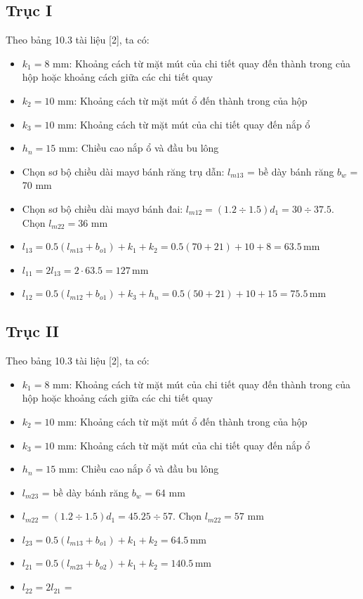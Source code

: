 \subsection{Trục I}
Theo bảng 10.3 tài liệu [2], ta có:
\begin{itemize}
    \item $k_1 = 8$ mm: Khoảng cách từ mặt mút của chi tiết quay đến thành trong của hộp hoặc khoảng cách giữa các chi tiết quay
    \item $k_2 = 10$ mm: Khoảng cách từ mặt mút ổ đến thành trong của hộp
    \item $k_3 = 10$ mm: Khoảng cách từ mặt mút của chi tiết quay đến nắp ổ
    \item $h_n = 15$ mm: Chiều cao nắp ổ và đầu bu lông
    \item Chọn sơ bộ chiều dài mayơ bánh răng trụ dẫn: $l_{m13}$ = bề dày bánh răng $b_w$ = 70 mm
    \item Chọn sơ bộ chiều dài mayơ bánh đai: $l_{m12} = (1.2\div 1.5)d_1 = 30 \div 37.5$. Chọn $l_{m22}=36$ mm 
    \item $l_{13} = 0.5(l_{m13} + b_{o1}) + k_1 + k_2 = 0.5(70 + 21) + 10 + 8 = 63.5 \, \text{mm}$
    \item $l_{11} = 2l_{13} = 2 \cdot 63.5 = 127 \, \text{mm}$
 
    \item $l_{12} = 0.5(l_{m12} + b_{o1}) + k_3 + h_n = 0.5(50 + 21) + 10 + 15 = 75.5 \, \text{mm}$
\end{itemize}

\subsection{Trục II}
Theo bảng 10.3 tài liệu [2], ta có:
\begin{itemize}
    \item $k_1 = 8$ mm: Khoảng cách từ mặt mút của chi tiết quay đến thành trong của hộp hoặc khoảng cách giữa các chi tiết quay
    \item $k_2 = 10$ mm: Khoảng cách từ mặt mút ổ đến thành trong của hộp
    \item $k_3 = 10$ mm: Khoảng cách từ mặt mút của chi tiết quay đến nắp ổ
    \item $h_n = 15$ mm: Chiều cao nắp ổ và đầu bu lông
    \item $l_{m23}$ = bề dày bánh răng $b_w$ = 64 mm
    \item $l_{m22} = (1.2\div 1.5)d_1 = 45.25 \div 57$. Chọn $l_{m22}=57$ mm
    \item $l_{23} = 0.5(l_{m13} + b_{o1}) + k_1 + k_2 = 64.5 \, \text{mm}$
    \item $l_{21} = 0.5(l_{m23} + b_{o2}) + k_1 + k_2 = 140.5 \, \text{mm}$
    \item $l_{22} = 2l_{21}$ = 
\end{itemize}

